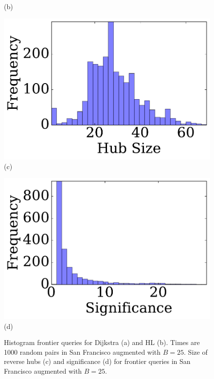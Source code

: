 \begin{figure}
\begin{minipage}[t]{.24\textwidth}
(b)
\end{minipage}%
\begin{minipage}[t]{.24\textwidth}
\centering
\includegraphics[clip, trim = 1.3cm 0.3cm 0cm 0cm,scale=0.225]{TexImg/SF_bwd_hub_size.pdf}\\
(c)
\end{minipage}%
\begin{minipage}[t]{.24\textwidth}
\centering
\includegraphics[clip, trim = 1.3cm 0.3cm 0cm 0cm,scale=0.225]{TexImg/significance.pdf}\\
(d)
\end{minipage}
\caption{ Histogram frontier queries for Dijkstra (a) and HL (b). Times are 1000 random pairs in San Francisco augmented with $B=25$.
Size of reverse hubs (c) and significance (d) for frontier queries in San Francisco augmented with $B=25$.
}
\label{fig:SF_query}
\label{fig:SF_bwd_size}
\end{figure}

